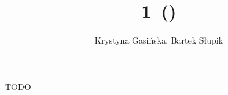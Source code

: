 \documentclass[12pt, a4paper]{article}
\title{1\minor\ (\dbl)}
\author{Krystyna Gasińska, Bartek Słupik}
\begin{document}
\maketitle


TODO

\end{document}
